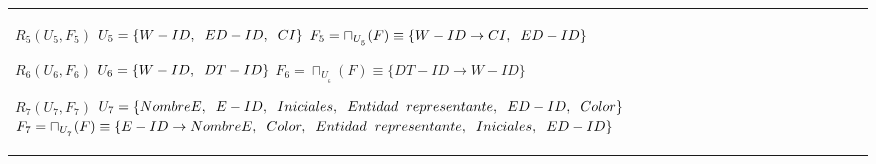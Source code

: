 \documentclass{report}
\begin{document}
\begin{tabularx}{\textwidth}{|X|}
        $ R_{5} ( U_{5} , F_{5} ) $ \newline 
        $ U_{5} = \{{W-ID, \hspace{0.2cm}  ED-ID, \hspace{0.2cm}  CI}\} $ \newline 
        $ F_{5} = \sqcap_{U_{_{5}}}(F) \equiv \{W-ID \rightarrow CI, \hspace{0.2cm} ED-ID \} $\newline 
        
        $ R_{6} ( U_{6} , F_{6} ) $ \newline 
        $ U_{6} = \{{W-ID, \hspace{0.2cm}  DT-ID}\} $ \newline 
        $ F_{6} = \sqcap_{U_{_{6}}}(F) \equiv \{DT-ID \rightarrow W-ID \} $\newline 
        
        $ R_{7} ( U_{7} , F_{7} ) $ \newline 
        $ U_{7} = \{{NombreE, \hspace{0.2cm}  E-ID, \hspace{0.2cm}  Iniciales, \hspace{0.2cm}  Entidad \hspace{0.2cm} representante, \hspace{0.2cm}  ED-ID, \hspace{0.2cm}  Color}\} $ \newline 
        $ F_{7} = \sqcap_{U_{_{7}}}(F) \equiv \{E-ID \rightarrow NombreE, \hspace{0.2cm} Color, \hspace{0.2cm} Entidad \hspace{0.2cm} representante, \hspace{0.2cm} Iniciales, \hspace{0.2cm} ED-ID \} $\newline 
        

\end{tabularx}
\end{document}

